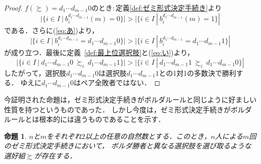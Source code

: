 \documentclass[dvipdfmx]{jsarticle}
\newtheorem{proposition}[definition]{命題}
\begin{document}
\begin{proof}
  \noindent$f(\succsim) = d_1\cdots d_{m-1}0$のとき$\colon$定義\ref{def:ゼミ形式決定手続き}より
  \[
    |\{ i \in I \ | \ b_{i}^{d_1\cdots d_{m-1}}(m)=0 \}| > |\{ i \in I \ | \ b_{i}^{d_1\cdots d_{m-1}}(m)=1 \}|
  \]
  である．さらに(\ref{eq:あ})より，
  \[
    |\{ i \in I \ | \ b_{i}^{d_1\cdots d_{m-1}}=d_1\cdots d_{m-1}0 \}| >
    |\{ i \in I \ | \ b_{i}^{d_1\cdots d_{m-1}}=d_1\cdots d_{m-1}1 \}|
  \]
  が成り立つ．最後に定義~\ref{def:最上位選択肢}と(\ref{eq:い})より，
  \[
    |\{ i \in I \ | \ d_1\cdots d_{m-1}0\ \succsim_i\ d_1\cdots d_{m-1}1 \}| >
    |\{ i \in I \ | \ d_1\cdots d_{m-1}1\ \succsim_i\ d_1\cdots d_{m-1}0 \}|
  \]
  したがって，選択肢$d_1\cdots d_{m-1}0$は選択肢$d_1\cdots d_{m-1}1$との1対1の多数決で勝利する．
  ゆえに$d_1\cdots d_{m-1}0$はペア全敗者ではない．
\end{proof}

今証明された命題は，ゼミ形式決定手続きがボルダルールと同じように好ましい性質を持つというものであった．
しかし今度は，ゼミ形式決定手続きがボルダルールとは根本的には違うものであることを示す．

\begin{proposition}
  $n$と$m$をそれぞれ$2$以上の任意の自然数とする．このとき，$n$人による$m$回のゼミ形式決定手続きにおいて，
  ボルダ勝者と異なる選択肢を選び取るような選好組$\succsim$が存在する．
\end{proposition}
\end{document}
